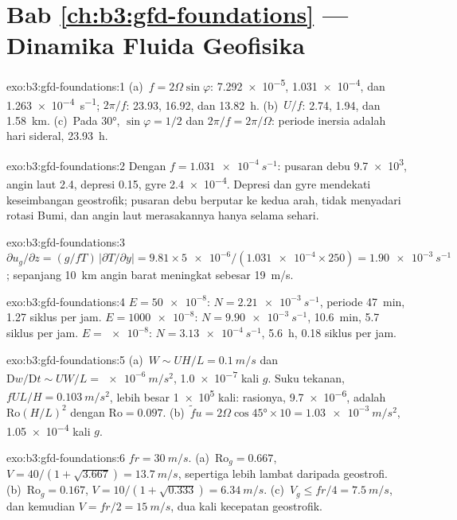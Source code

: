 \section*{Bab \ref{ch:b3:gfd-foundations} --- Dinamika Fluida Geofisika}

\begin{solution}{exo:b3:gfd-foundations:1}
(a)~$f = 2\Omega\sin\varphi$: \num{7.292e-5}, \num{1.031e-4}, dan
\qty{1.263e-4}{s^{-1}}; $2\pi/f$: 23.93, 16.92, dan \qty{13.82}{h}.
(b)~$U/f$: 2.74, 1.94, dan \qty{1.58}{km}. (c)~Pada \ang{30}, $\sin\varphi =
1/2$ dan $2\pi/f = 2\pi/\Omega$: periode inersia adalah hari sideral,
\qty{23.93}{h}.
\end{solution}

\begin{solution}{exo:b3:gfd-foundations:2}
Dengan $f = \qty{1.031e-4}{s^{-1}}$: pusaran debu \num{9.7e3}, angin laut 2.4,
depresi 0.15, gyre \num{2.4e-4}. Depresi dan gyre mendekati
keseimbangan geostrofik; pusaran debu berputar ke kedua arah, tidak menyadari
rotasi Bumi, dan angin laut merasakannya hanya selama sehari.
\end{solution}

\begin{solution}{exo:b3:gfd-foundations:3}
$\partial u_g/\partial z = (g/fT)\,|\partial T/\partial y| = 9.81\times
\num{5e-6}/(\num{1.031e-4}\times250) = \qty{1.90e-3}{s^{-1}}$; sepanjang
\qty{10}{km} angin barat meningkat sebesar \qty{19}{m/s}.
\end{solution}

\begin{solution}{exo:b3:gfd-foundations:4}
$E = \num{50e-8}$: $N = \qty{2.21e-3}{s^{-1}}$, periode \qty{47}{min},
\num{1.27} siklus per jam. $E = \num{1000e-8}$: $N = \qty{9.90e-3}{s^{-1}}$,
\qty{10.6}{min}, 5.7 siklus per jam. $E = \num{e-8}$: $N =
\qty{3.13e-4}{s^{-1}}$, \qty{5.6}{h}, 0.18 siklus per jam.
\end{solution}

\begin{solution}{exo:b3:gfd-foundations:5}
(a)~$W \sim UH/L = \qty{0.1}{m/s}$ dan $\mathrm Dw/\mathrm Dt \sim UW/L =
\qty{e-6}{m/s^2}$, \num{1.0e-7} kali $g$. Suku tekanan, $fUL/H =
\qty{0.103}{m/s^2}$, lebih besar \num{1e5} kali: rasionya, \num{9.7e-6}, adalah
$\mathrm{Ro}(H/L)^2$ dengan $\mathrm{Ro} = 0.097$. (b)~$\tilde fu =
2\Omega\cos\ang{45}\times10 = \qty{1.03e-3}{m/s^2}$, \num{1.05e-4} kali $g$.
\end{solution}

\begin{solution}{exo:b3:gfd-foundations:6}
$fr = \qty{30}{m/s}$. (a)~$\mathrm{Ro}_g = 0.667$, $V = 40/(1 + \sqrt{3.667})
= \qty{13.7}{m/s}$, sepertiga lebih lambat daripada geostrofi. (b)~$\mathrm{Ro}_g =
0.167$, $V = 10/(1 + \sqrt{0.333}) = \qty{6.34}{m/s}$. (c)~$V_g \le fr/4 =
\qty{7.5}{m/s}$, dan kemudian $V = fr/2 = \qty{15}{m/s}$, dua kali
kecepatan geostrofik.
\end{solution}

